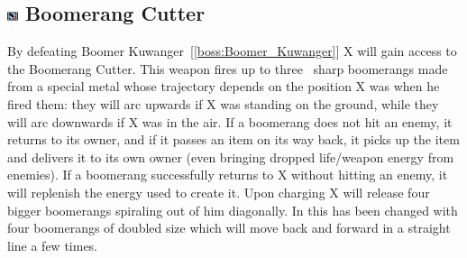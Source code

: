 \subsection{\includegraphics[width=12px, height=10px]{figures/X1/weapons/B_cutter.jpg} Boomerang Cutter}\label{Boomerang_cutter}
By defeating Boomer Kuwanger~[\ref{boss:Boomer_Kuwanger}] X will gain access to the 
Boomerang Cutter. This weapon fires up to three~\cite{wiki:Boomerang_cutter} sharp boomerangs made from a special metal whose trajectory depends on the position X was when he fired them: they will arc upwards if X was standing on the ground, while they will arc downwards if X was in the air. If a boomerang does not hit an enemy, it returns to its owner, and if it passes an item on its way back, it picks up the item and delivers it to its own owner (even bringing dropped life/weapon energy from enemies). If a boomerang successfully returns to X without hitting an enemy, it will replenish the energy used to create it. Upon charging X will release four bigger boomerangs spiraling out of him diagonally. In \mhx this has been changed with four boomerangs of doubled size which will move back and forward in a straight line a few times. 

